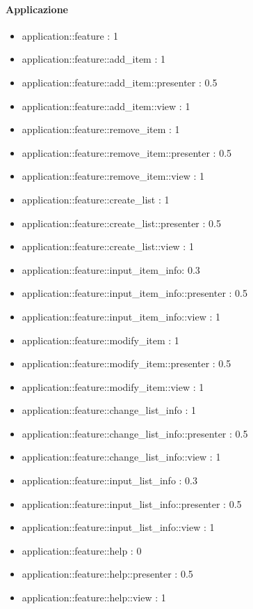 \paragraph{Applicazione}

\begin{itemize}

\item application::feature : 1
\item application::feature::add\_item : 1
\item application::feature::add\_item::presenter : 0.5
\item application::feature::add\_item::view : 1
\item application::feature::remove\_item : 1
\item application::feature::remove\_item::presenter : 0.5
\item application::feature::remove\_item::view : 1
\item application::feature::create\_list : 1
\item application::feature::create\_list::presenter : 0.5
\item application::feature::create\_list::view : 1
\item application::feature::input\_item\_info: 0.3
\item application::feature::input\_item\_info::presenter : 0.5
\item application::feature::input\_item\_info::view : 1
\item application::feature::modify\_item : 1
\item application::feature::modify\_item::presenter : 0.5
\item application::feature::modify\_item::view : 1
\item application::feature::change\_list\_info : 1
\item application::feature::change\_list\_info::presenter : 0.5
\item application::feature::change\_list\_info::view : 1
\item application::feature::input\_list\_info : 0.3
\item application::feature::input\_list\_info::presenter : 0.5
\item application::feature::input\_list\_info::view : 1
\item application::feature::help : 0
\item application::feature::help::presenter : 0.5
\item application::feature::help::view : 1

\end{itemize}
